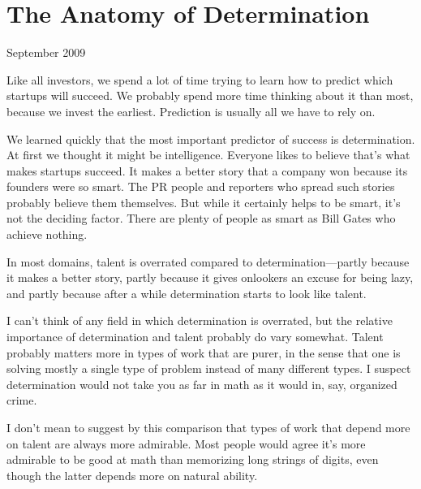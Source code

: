 \chapter{The Anatomy of Determination}


            
              
                


                  
                    September 2009

Like all investors, we spend a lot
                    of time trying to learn how to predict which startups will
                    succeed. We probably spend more time thinking about it than
                    most, because we invest the earliest. Prediction is usually
                    all we have to rely on.

We learned quickly that
                    the most important predictor of success is determination. At
                    first we thought it might be intelligence. Everyone likes to
                    believe that's what makes startups succeed. It makes a
                    better story that a company won because its founders were so
                    smart. The PR people and reporters who spread such stories
                    probably believe them themselves. But while it certainly
                    helps to be smart, it's not the deciding factor. There are
                    plenty of people as smart as Bill Gates who achieve
                    nothing.

In most domains, talent is overrated
                    compared to determination---partly because it makes a
                    better story, partly because it gives onlookers an excuse
                    for being lazy, and partly because after a while
                    determination starts to look like talent.

I can't
                    think of any field in which determination is overrated, but
                    the relative importance of determination and talent probably
                    do vary somewhat. Talent probably matters more in types of
                    work that are purer, in the sense that one is solving mostly
                    a single type of problem instead of many different types. I
                    suspect determination would not take you as far in math as
                    it would in, say, organized crime.

I don't mean
                    to suggest by this comparison that types of work that depend
                    more on talent are always more admirable. Most people would
                    agree it's more admirable to be good at math than memorizing
                    long strings of digits, even though the latter depends more
                    on natural ability.

